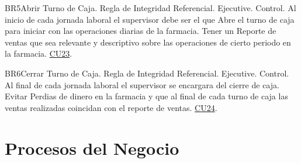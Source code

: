 \begin{BussinesRule}{BR5}{Abrir Turno de Caja.}
	\BRitem[Tipo:] Regla de Integridad Referencial. 
	\BRitem[Clase:] Ejecutive. 
	\BRitem[Nivel:] Control. %
	\BRitem[Descripción:]Al inicio de cada jornada laboral el supervisor debe ser el que Abre el turno de caja para iniciar con las operaciones diarias de la farmacia.
	\BRitem[Motivación:] Tener un Reporte de ventas que sea relevante y descriptivo sobre las operaciones de cierto periodo en la farmacia.
	 \hyperlink{CU23}{CU23}.
\end{BussinesRule}

\begin{BussinesRule}{BR6}{Cerrar Turno de Caja.}
	\BRitem[Tipo:] Regla de Integridad Referencial. 
	\BRitem[Clase:] Ejecutive. 
	\BRitem[Nivel:] Control. %
	\BRitem[Descripción:]Al final de cada jornada laboral el supervisor se encargara del cierre de caja.
	\BRitem[Motivación:] Evitar Perdias de dinero en la farmacia y que al final de cada turno de caja las ventas realizadas coincidan con el reporte de ventas.
	 \hyperlink{CU24}{CU24}.
\end{BussinesRule}
\newpage


\section{Procesos del Negocio}













